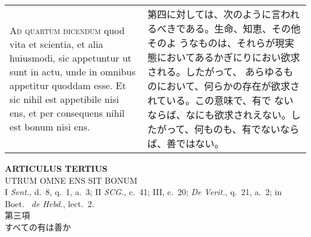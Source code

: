 \documentclass[10pt]{jsarticle} %
\begin{document}
\begin{longtable}{p{21em}p{21em}}
\\

{\scshape Ad quartum dicendum} quod vita et scientia, et alia huiusmodi,
 sic appetuntur ut sunt in actu, unde in omnibus appetitur quoddam
 esse. Et sic nihil est appetibile nisi ens, et per consequens nihil est
 bonum nisi ens.

&

第四に対しては、次のように言われるべきである。生命、知恵、その他そのよ
うなものは、それらが現実態においてあるかぎにりにおい欲求される。したがって、
 あらゆるものにおいて、何らかの存在が欲求されている。この意味で、有で
 ないならば、なにも欲求されえない。したがって、何ものも、有でないなら
 ば、善ではない。




\end{longtable}
\newpage
{}
 

\begin{center}
 {\Large {\bf ARTICULUS TERTIUS}}\\
 {\large UTRUM OMNE ENS SIT BONUM}\\
 {\footnotesize I {\itshape Sent.}, d.~8, q.~1, a.~3; II {\itshape
 SCG.}, c.~41; III, c.~20; {\itshape De Verit.}, q.~21, a.~2; in Boet.~
 {\itshape de Hebd.}, lect.~2.}\\
 {\Large 第三項\\すべての有は善か}
\end{center}
\end{document}
